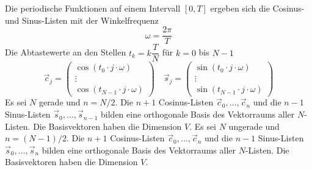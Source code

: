 Die periodische Funktionen auf einem Intervall $[0,T]$ ergeben sich die Cosinus- und Sinus-Listen mit der Winkelfrequenz
\begin{equation}
\boxed{\omega=\dfrac{2\pi}{T}}
\end{equation}
Die Abtastewerte an den Stellen $t_k=k\dfrac{T}{N}$ für $k=0$ bis $N-1$
\begin{equation}
\boxed{\overrightarrow{c}_j=\begin{pmatrix}\cos\left(t_0\cdot j\cdot \omega\right)\\\vdots\\\cos\left(t_{N-1}\cdot j\cdot \omega\right)\end{pmatrix}}\quad \boxed{\overrightarrow{s}_j=\begin{pmatrix}\sin\left(t_0\cdot j\cdot \omega\right)\\\vdots\\\sin\left(t_{N-1}\cdot j\cdot \omega\right)\end{pmatrix}}
\end{equation}
Es sei $N$ gerade und $n=N/2$. Die $n+1$ Cosinus-Listen $\overrightarrow{c}_0,\dotso, \overrightarrow{c}_n$ und die $n-1$ Sinus-Listen $\overrightarrow{s}_0,\dotso,\overrightarrow{s}_{n-1}$ bilden eine orthogonale Basis des Vektorraums aller $N$-Listen. Die Basisvektoren haben die Dimension $V$.
\newline\newline
Es sei $N$ ungerade und $n=(N-1)/2$. Die $n+1$ Cosinus-Listen $\overrightarrow{c}_0,\dotso, \overrightarrow{c}_n$ und die $n-1$ Sinus-Listen $\overrightarrow{s}_0,\dotso,\overrightarrow{s}_{n}$ bilden eine orthogonale Basis des Vektorraums aller $N$-Listen. Die Basisvektoren haben die Dimension $V$.
